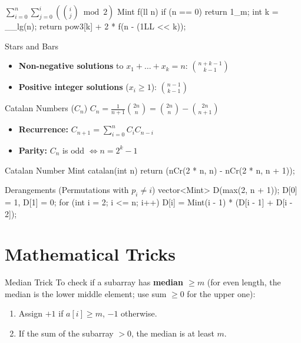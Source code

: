 \documentclass[10pt]{article}
\newcommand{\complexity}[1]{%
  \tcbox[on line,
    colback=tagbg,
    colframe=tagbg,
    boxrule=0pt,
    arc=2pt,
    boxsep=0pt,
    left=3.5pt, right=3.5pt, top=1.5pt, bottom=1.5pt
  ]{\color{tagtext}\scriptsize\bfseries\ensuremath{#1}}%
}
\begin{document}
\begin{vscode}{$\sum_{i=0}^n \sum_{j=0}^i \left( \binom{i}{j} \bmod 2 \right)$ \complexity{O(\log n)}}
Mint f(ll n)
{
    if (n == 0)
        return 1_m;
    int k = __lg(n);
    return pow3[k] + 2 * f(n - (1LL << k));
}
\end{vscode}

\begin{conceptbox}{Stars and Bars}
    \begin{itemize}
        \item \textbf{Non-negative solutions} to $x_1 + \dots + x_k = n$: $\binom{n+k-1}{k-1}$
        \item \textbf{Positive integer solutions} ($x_i \ge 1$): $\binom{n-1}{k-1}$
    \end{itemize}
\end{conceptbox}

\begin{conceptbox}{Catalan Numbers ($C_n$)}
    $C_n = \frac{1}{n+1}\binom{2n}{n} = \binom{2n}{n} - \binom{2n}{n+1}$
    \begin{itemize}
        \item \textbf{Recurrence:} $C_{n+1} = \sum_{i=0}^n C_i C_{n-i}$
        \item \textbf{Parity:} $C_n$ is odd $\iff n = 2^k - 1$
    \end{itemize}
\end{conceptbox}

\begin{vscode}{Catalan Number \complexity{O(1)}}
Mint catalan(int n) 
{
    return (nCr(2 * n, n) - nCr(2 * n, n + 1));
}
\end{vscode}

\begin{vscode}{Derangements (Permutations with $p_i \neq i$) \complexity{O(N)}}
vector<Mint> D(max(2, n + 1));
D[0] = 1, D[1] = 0;
for (int i = 2; i <= n; i++)
    D[i] = Mint(i - 1) * (D[i - 1] + D[i - 2]);
\end{vscode}

\newpage
\section{Mathematical Tricks}

\begin{conceptbox}{Median Trick}
    To check if a subarray has \textbf{median $\geq m$} (for even length, the median is the lower middle element; use sum $\ge 0$ for the upper one):
    \begin{enumerate}
        \item Assign $+1$ if $a[i] \geq m$, $-1$ otherwise.
        \item If the sum of the subarray $> 0$, the median is at least $m$.
    \end{enumerate}
\end{conceptbox}
\end{document}

